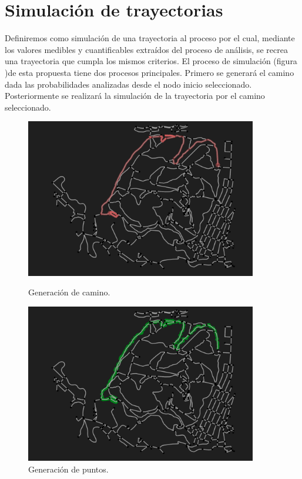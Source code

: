 
\chapter{Simulación de trayectorias}
Definiremos como simulación de una trayectoria al proceso por el cual, mediante los valores 
medibles y cuantificables extraídos del proceso de análisis, se recrea una trayectoria que cumpla 
los mismos criterios. El proceso de simulación (figura )de esta propuesta tiene dos procesos principales.
Primero se generará el camino dada las probabilidades analizadas desde el nodo inicio seleccionado.
Posteriormente se realizará la simulación de la trayectoria por el camino seleccionado.
\begin{figure}[!htb]
\begin{minipage}{0.48\textwidth}
\centering
\includegraphics[width=0.9\textwidth]{./Imagenes/TrackGenerationSegments.png}
\caption{Generación de camino.}
\label{figure:PointToProjection}
\end{minipage}\hfill
\begin{minipage}{0.48\textwidth}
\centering
\includegraphics[width=0.9\textwidth]{./Imagenes/TrackGenerationPoints.png}
\caption{Generación de puntos.}
\label{figure:PointToPoint}
\end{minipage}
\end{figure}

